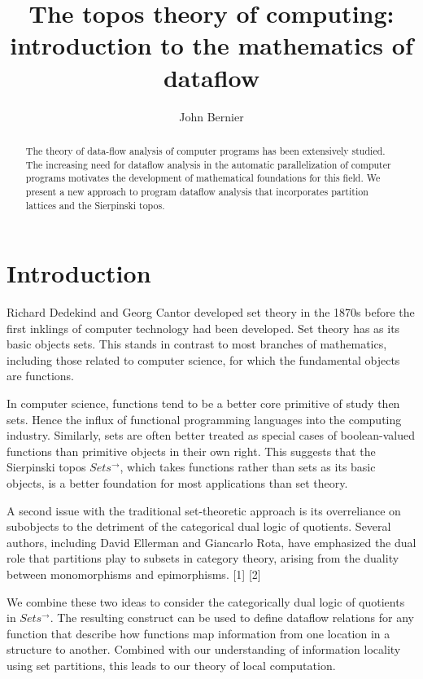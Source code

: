 \documentclass[a4paper,11pt, notitlepage]{report}
\title{The topos theory of computing: introduction to the mathematics of dataflow}
\author{John Bernier}
\theoremstyle{definition}
\begin{document}
\maketitle
\begin{abstract}
The theory of data-flow analysis of computer programs has been extensively studied. The increasing need for dataflow analysis in the automatic parallelization of computer programs motivates the development of mathematical foundations for this field. We present a new approach to program dataflow analysis that incorporates partition lattices and the Sierpinski topos.
\end{abstract}

\tableofcontents

\chapter{Introduction}
Richard Dedekind and Georg Cantor developed set theory in the 1870s before the first inklings of computer technology had been developed. Set theory has as its basic objects sets. This stands in contrast to most branches of mathematics, including those related to computer science, for which the fundamental objects are functions.

In computer science, functions tend to be a better core primitive of study then sets. Hence the influx of functional programming languages into the computing industry. Similarly, sets are often better treated as special cases of boolean-valued functions than primitive objects in their own right. This suggests that the Sierpinski topos $Sets^{\to}$, which takes functions rather than sets as its basic objects, is a better foundation for most applications than set theory.

A second issue with the traditional set-theoretic approach is its overreliance on subobjects to the detriment of the categorical dual logic of quotients. Several authors, including David Ellerman and Giancarlo Rota, have emphasized the dual role that partitions play to subsets in category theory, arising from the duality between monomorphisms and epimorphisms. [1] [2]

We combine these two ideas to consider the categorically dual logic of quotients in $Sets^{\to}$. The resulting construct can be used to define dataflow relations for any function that describe how functions map information from one location in a structure to another. Combined with our understanding of information locality using set partitions, this leads to our theory of local computation.
\end{document}

